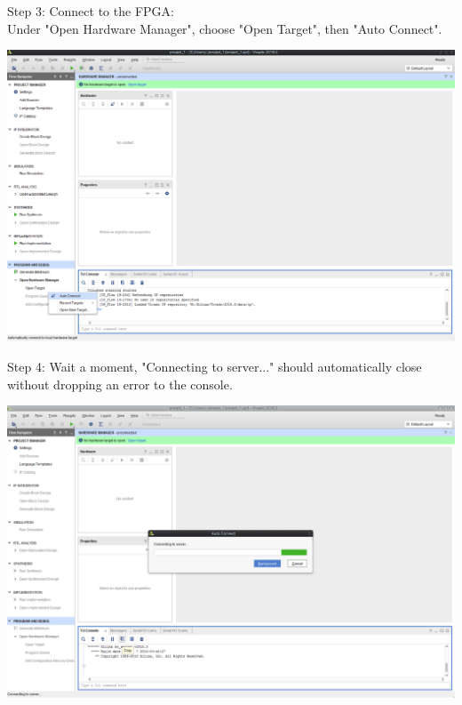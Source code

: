 \begin{minipage}{\linewidth}
  Step 3: Connect to the FPGA: \\
  Under "Open Hardware Manager", choose "Open Target", then "Auto Connect".
  \\
  \begin{center}
    \includegraphics[width=0.8\linewidth]{images/vivado03.png}
  \end{center}
\end{minipage}

\vspace{5mm}

\begin{minipage}{\linewidth}
  Step 4: Wait a moment, "Connecting to server..."  should
  automatically close without dropping an error to the console.
  \\
  \begin{center}
    \includegraphics[width=0.8\linewidth]{images/vivado04.png}
  \end{center}
\end{minipage}


